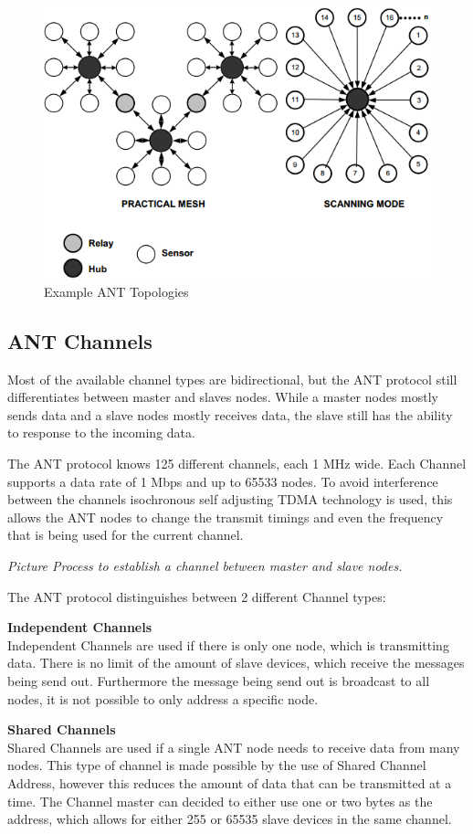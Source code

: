 \begin{figure}[h]
	\centering
	\includegraphics[scale=0.7]{./pics/ANTtopo.png}
	\caption{Example ANT Topologies}\label{fig:anttopo}
\end{figure}


\subsection{ANT Channels}
Most of the available channel types are bidirectional, but the ANT protocol still differentiates between master and slaves nodes. While a master nodes mostly sends data and a slave nodes mostly receives data, the slave still has the ability to response to the incoming data.

The ANT protocol knows 125 different channels, each 1 MHz wide. Each Channel supports a data rate of 1 Mbps and up to 65533 nodes. To avoid interference between the channels isochronous self adjusting TDMA technology is used, this allows the ANT nodes to change the transmit timings and even the frequency that is being used for the current channel.

\textit{Picture Process to establish a channel between master and slave nodes.}

The ANT protocol distinguishes between 2 different Channel types:
\begin{description}
\item{\textbf{Independent Channels}} \hfill \\ Independent Channels are used if there is only one node, which is transmitting data. There is no limit of the amount of slave devices, which receive the messages being send out. Furthermore the message being send out is broadcast to all nodes, it is not possible to only address a specific node.
\item{\textbf{Shared Channels}} \hfill \\ Shared Channels are used if a single ANT node needs to receive data from many nodes. This type of channel is made possible by the use of Shared Channel Address, however this reduces the amount of data that can be transmitted at a time. The Channel master can decided to either use one or two bytes as the address, which allows for either 255 or 65535 slave devices in the same channel.
\end{description}

